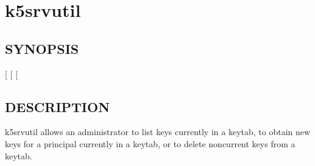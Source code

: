 \documentclass[letterpaper,10pt,english]{sphinxmanual}
\begin{document}
\sphinxstepscope


\section{k5srvutil}
\label{\detokenize{admin/admin_commands/k5srvutil:k5srvutil}}\label{\detokenize{admin/admin_commands/k5srvutil:k5srvutil-1}}\label{\detokenize{admin/admin_commands/k5srvutil::doc}}

\subsection{SYNOPSIS}
\label{\detokenize{admin/admin_commands/k5srvutil:synopsis}}
\sphinxAtStartPar
{} 
{[}\sphinxstylestrong{\sphinxhyphen{}i}{]}
{[} \sphinxstyleemphasis{filename}{]}
{[} \sphinxstyleemphasis{keysalts}{]}


\subsection{DESCRIPTION}
\label{\detokenize{admin/admin_commands/k5srvutil:description}}
\sphinxAtStartPar
k5srvutil allows an administrator to list keys currently in
a keytab, to obtain new keys for a principal currently in a keytab,
or to delete non\sphinxhyphen{}current keys from a keytab.
\end{document}
